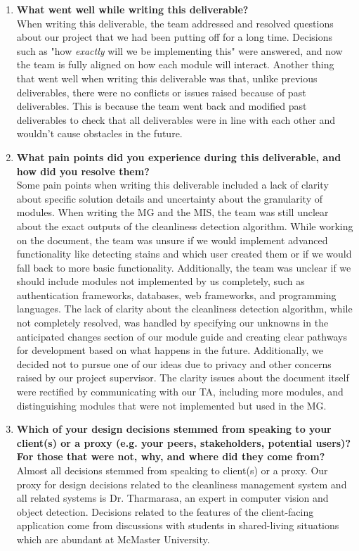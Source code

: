 \documentclass[12pt, titlepage]{article}
\begin{document}
\begin{enumerate}
  \item \textbf{What went well while writing this deliverable?}\\
  When writing this deliverable, the team addressed and resolved questions about our project that we had been putting off for a long time. Decisions such as "how \textit{exactly} will we be implementing this" were answered, and now the team is fully aligned on how each module will interact. Another thing that went well when writing this deliverable was that, unlike previous deliverables, there were no conflicts or issues raised because of past deliverables. This is because the team went back and modified past deliverables to check that all deliverables were in line with each other and wouldn't cause obstacles in the future.
  \item \textbf{What pain points did you experience during this deliverable, and how
    did you resolve them?}\\
    Some pain points when writing this deliverable included a lack of clarity about specific solution details and uncertainty about the granularity of modules. When writing the MG and the MIS, the team was still unclear about the exact outputs of the cleanliness detection algorithm. While working on the document, the team was unsure if we would implement advanced functionality like detecting stains and which user created them or if we would fall back to more basic functionality. Additionally, the team was unclear if we should include modules not implemented by us completely, such as authentication frameworks, databases, web frameworks, and programming languages. The lack of clarity about the cleanliness detection algorithm, while not completely resolved, was handled by specifying our unknowns in the anticipated changes section of our module guide and creating clear pathways for development based on what happens in the future. Additionally, we decided not to pursue one of our ideas due to privacy and other concerns raised by our project supervisor. The clarity issues about the document itself were rectified by communicating with our TA, including more modules, and distinguishing modules that were not implemented but used in the MG.      
  \item \textbf{Which of your design decisions stemmed from speaking to your client(s)
  or a proxy (e.g. your peers, stakeholders, potential users)? For those that
  were not, why, and where did they come from?}\\
  Almost all decisions stemmed from speaking to client(s) or a proxy. Our proxy for design decisions related to the cleanliness management system and all related systems is Dr. Tharmarasa, an expert in computer vision and object detection. Decisions related to the features of the client-facing application come from discussions with students in shared-living situations which are abundant at McMaster University.

\end{enumerate}
\end{document}
